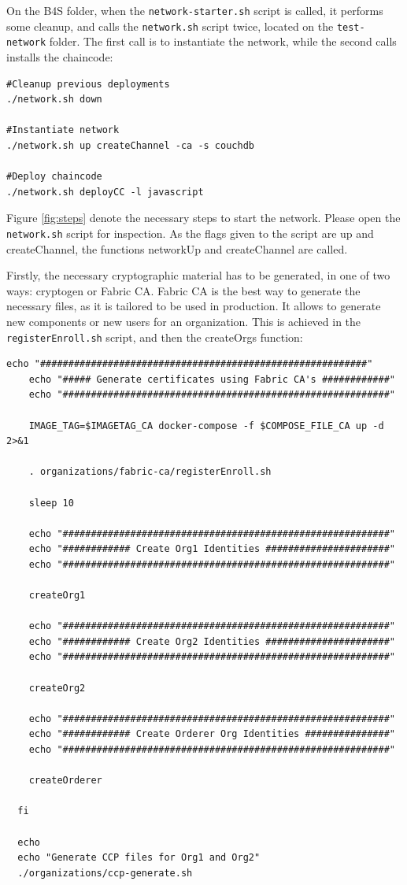 \documentclass[12pt,a4paper]{article}
\theoremstyle{definition}
\begin{document}
On the B4S folder, when the \texttt{network-starter.sh} script is called, it performs some cleanup, and calls the \texttt{network.sh} script twice, located on the \texttt{test-network} folder. The first call is to instantiate the network, while the second calls installs the chaincode:

\begin{verbatim}
#Cleanup previous deployments
./network.sh down

#Instantiate network
./network.sh up createChannel -ca -s couchdb

#Deploy chaincode
./network.sh deployCC -l javascript
\end{verbatim}

Figure \ref{fig:steps} denote the necessary steps to start the network. Please open the \texttt{network.sh} script for inspection. As the flags given to the script are up and createChannel, the functions networkUp and createChannel are called. 

Firstly, the necessary cryptographic material has to be generated, in one of two ways: cryptogen or Fabric CA. Fabric CA is the best way to generate the necessary files, as it is tailored to be used in production. It allows to generate new components or new users for an organization. This is achieved in the \texttt{registerEnroll.sh} script, and then the createOrgs function:

\begin{verbatim}
echo "##########################################################"
    echo "##### Generate certificates using Fabric CA's ############"
    echo "##########################################################"

    IMAGE_TAG=$IMAGETAG_CA docker-compose -f $COMPOSE_FILE_CA up -d 2>&1

    . organizations/fabric-ca/registerEnroll.sh

    sleep 10

    echo "##########################################################"
    echo "############ Create Org1 Identities ######################"
    echo "##########################################################"

    createOrg1

    echo "##########################################################"
    echo "############ Create Org2 Identities ######################"
    echo "##########################################################"

    createOrg2

    echo "##########################################################"
    echo "############ Create Orderer Org Identities ###############"
    echo "##########################################################"

    createOrderer

  fi

  echo
  echo "Generate CCP files for Org1 and Org2"
  ./organizations/ccp-generate.sh
\end{verbatim}
\end{document}
